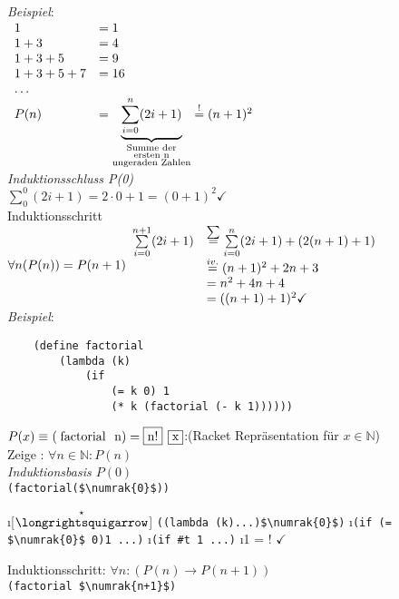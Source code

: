 {\em Beispiel}:\\
$\begin{array}{ll}
1 & = 1\\
1 + 3 & = 4\\
1 + 3 + 5 & = 9\\
1 + 3 + 5 + 7 & = 16\\
\ldots\\
P(n) & = \underbrace{\sum\limits_{i=0}^{n} (2i + 1)}_{\substack{\text{Summe der}\\
			\text{ersten n}\\
			\text{ungeraden Zahlen}}} \overset{!}{=} (n+1)^2
\end{array}$\\
\emph{Induktionsschluss P(0)}\\
$\sum\limits_{0}^{0} (2i + 1) = 2 \cdot 0 + 1 = (0 + 1)^ 2 \checkmark$\\
Induktionsschritt $\forall n (P(n)) = P (n+1)\\
\begin{array}{ll}
\sum\limits_{i=0}^{n+1} (2i + 1) &\overset{\sum}{=} \sum\limits_{i=0}^{n} (2i + 1) + (2 (n+1) +1)\\
&\overset{iv.}{=} (n+1)^2 + 2n +3\\
&= n^2 + 4n + 4\\
 &= ((n+1)+1)^2 \checkmark
\end{array}$\\
{\em Beispiel}:\\
\begin{lstlisting}
	(define factorial 
		(lambda (k)
			(if 
				(= k 0) 1
				(* k (factorial (- k 1))))))
\end{lstlisting}
$P(x) \equiv \text{\lstinline!(factorial n)!} = \fbox{n!}$ \hfill $\fbox{x}$:(Racket Repräsentation für $x \in \mathbb{N}$)\\
Zeige : $\forall n \in \mathbb{N} : P(n)$\\
\emph{Induktionsbasis $P(0)$}\\
\lstinline[mathescape]!(factorial($\numrak{0}$))!\\
\begin{enumerate}[\eval]
\i[$\overset{\star}{\text{\eval}}$] \lstinline[mathescape]!((lambda (k)...)$\numrak{0}$)!
\i \lstinline[mathescape]|(if (= $\numrak{0}$ 0)1 ...)|
\i \lstinline[]|(if #t|\lstinline| 1 ...)|
\i 1 = ! $\checkmark $
\end{enumerate}
Induktionsschritt: $\forall n : (P(n) \rightarrow P(n+1))$\\
\lstinline[mathescape]|(factorial $\numrak{n+1}$)|
